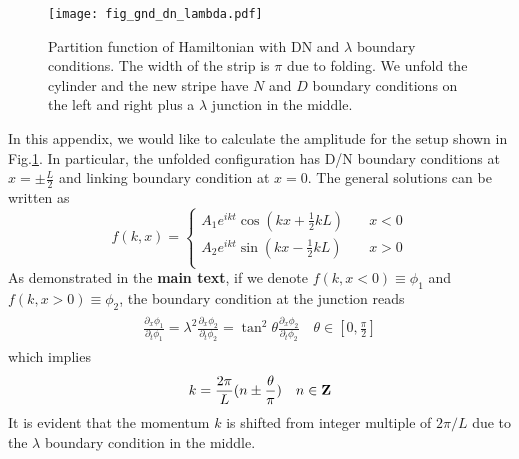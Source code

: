 
\begin{figure}[h]
\centering
\texttt{[image: fig\_gnd\_dn\_lambda.pdf]}
\caption{Partition function of Hamiltonian with DN and $\lambda$ boundary conditions. The width of the strip is $\pi$ due to folding. We unfold the cylinder and the new stripe have $N$ and $D$ boundary conditions on the left and right plus a $\lambda$ junction in the middle. }
\label{Fig in gnd_dn_lambda}
\end{figure}

In this appendix, we would like to calculate the amplitude for the setup shown in Fig.\ref{Fig in gnd_dn_lambda}. In particular, the unfolded configuration has D/N boundary conditions at $x = \pm \frac{L}{2}$ and linking boundary condition at $x = 0$. The general solutions can be written as
\begin{equation}
\label{Normalized f in gnd_dn_lambda}
f(k, x) = 
\left\lbrace
\begin{aligned}
  A_1 e^{i kt} \cos(kx +\frac{1}{2}kL ) &  \quad x < 0  \\
  A_2 e^{ikt}  \sin(kx - \frac{1}{2}kL ) & \quad x > 0   \\
\end{aligned} \right. 
\end{equation}
As demonstrated in the {\bf\color{red}main text}, if we denote $f(k,x<0)\equiv\phi_1$ and $f(k,x>0)\equiv\phi_2$, the boundary condition at the junction reads
\begin{eqnarray}\begin{aligned}
\frac{\partial_x \phi_1}{ \partial_t \phi_1} = \lambda^2 \frac{\partial_x \phi_2}{ \partial_t \phi_2} = \tan^2 \theta\frac{\partial_x \phi_2}{ \partial_t \phi_2} \quad \theta \in [0,\frac{\pi}{2} ]  
\end{aligned}\end{eqnarray}
which implies
\begin{equation}
\label{Momentum in gnd_dn_lambda}
k = \frac{2\pi}{L}( n \pm \frac{\theta}{\pi} )  \quad n\in{\bf Z}
\end{equation}
It is evident that the momentum $k$ is shifted from integer multiple of $2\pi/L$ due to the $\lambda$ boundary condition in the middle. 
